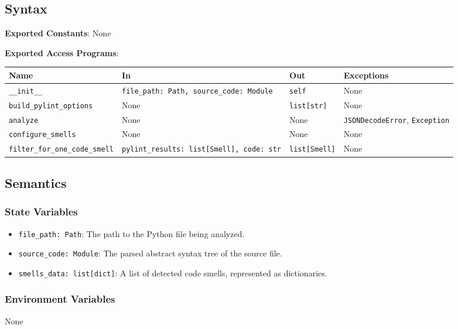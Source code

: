 \documentclass[12pt, titlepage]{article}
\begin{document}
\subsection{Syntax}
\noindent
\textbf{Exported Constants}: None

\noindent
\textbf{Exported Access Programs}:\\
{\footnotesize
\begin{tabularx}{\linewidth}{|
    l|
    >{\raggedright\arraybackslash}X|
    l|
    l|}
  \hline
  \textbf{Name} & \textbf{In} & \textbf{Out} & \textbf{Exceptions} \\\hline
  \texttt{\_\_init\_\_} & \texttt{file\_path: Path, source\_code: Module} & \texttt{self} & None \\
  \hline
  \texttt{build\_pylint\_options} & None & \texttt{list[str]} & None \\
  \hline
  \texttt{analyze} & None & None & \texttt{JSONDecodeError}, \texttt{Exception} \\
  \hline
  \texttt{configure\_smells} & None & None & None \\
  \hline
  \texttt{filter\_for\_one\_code\_smell} & \texttt{pylint\_results: list[Smell], code: str} & \texttt{list[Smell]} & None \\
  \hline
\end{tabularx}
}

\subsection{Semantics}

\subsubsection{State Variables}
\begin{itemize}
  \item \texttt{file\_path: Path}: The path to the Python file being analyzed.
  \item \texttt{source\_code: Module}: The parsed abstract syntax tree of the source file.
  \item \texttt{smells\_data: list[dict]}: A list of detected code smells, represented as dictionaries.
\end{itemize}

\subsubsection{Environment Variables}
None
\end{document}
